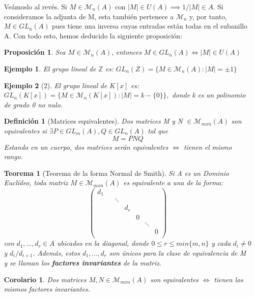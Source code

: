 \documentclass[11pt, a4paper, titlepage]{article}
\newif\IfInSansMode
\providecommand{\ent}{\mathbb{Z}}
\theoremstyle{theorem-style}
\newtheorem{nth}{Teorema}[section]
\newtheorem{nprop}{Proposición}[section]
\newtheorem{ncor}{Corolario}[section]
\theoremstyle{definition-style}
\newtheorem{ndef}{Definición}[section]
\theoremstyle{remark-style}
\theoremstyle{example-style}
\newtheorem{ejemplo}{Ejemplo}[section]
\begin{document}
Veámoslo al revés. Si $M\in \mathcal{M}_n(A)$ con $|M| \in U(A) \implies 1/|M| \in A$. Si consideramos la adjunta de M, esta también pertenece a $\mathcal{M}_n$ y, por tanto, $M \in GL_n(A)$ pues tiene una inversa cuyas entradas están todas en el subanillo A.
Con todo esto, hemos deducido la siguiente proposición:

\begin{nprop}
	Sea $M \in \mathcal{M}_n(A)$, entonces $M \in GL_n(A) \iff |M| \in U(A)$
\end{nprop}

\begin{ejemplo}
	El grupo lineal de $\ent$ es: $GL_n(Z) = \{M \in \mathcal{M}_n(A) :  |M| = \pm 1\}$
\end{ejemplo}

\begin{ejemplo}[2]
	El grupo lineal de $K[x]$ es: $GL_n(K[x]) = \{M \in \mathcal{M}_n(K[x]) :  |M| = k - \{0\} \},$ donde k es un polinomio de grado 0 no nulo.
\end{ejemplo}

\begin{ndef}[Matrices equivalentes]
	Dos matrices M y N $\in \mathcal{M}_{mxn}(A)$ son equivalentes si $\exists P\in GL_m(A), Q \in GL_n(A)$ tal que
	\[
	M = PNQ
	\]
Estando en un cuerpo, dos matrices serán equivalentes $\iff$ tienen el mismo rango.
\end{ndef}

\begin{nth}[Teorema de la forma Normal de Smith]
	Si A es un Dominio Euclídeo, toda matriz  $M \in \mathcal{M}_{mxn}(A)$ es equivalente a una de la forma:
		\[ \begin{pmatrix}
			 d_{1}&  &  & & \\
			 &  & \ddots &  &  \\
			 & & &d_{r} &\\
			 & & & & 0 \\
			 & & & & & \ddots& \\
			 & & & &  & & 0 \\
		\end{pmatrix} \]
con $d_{1},...,d_{r} \in A$ ubicados en la diagonal, donde $ 0 \leq r \leq min\{m,n\} $ y cada $d_{i}\ne 0$ y $d_{i}/ d_{i+1}$.  Además, estos $d_{1}, ...,d_{r}$ son únicos para la clase de equivalencia de M y se llaman los \textbf{factores invariantes} de la matriz.
\end{nth}

\begin{ncor}
	Dos matrices $M,N \in \mathcal{M}_{mxn}(A)$ son equivalentes $\iff$ tienen los mismos factores invariantes.
\end{ncor}
\end{document}
